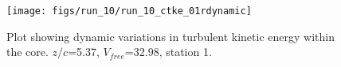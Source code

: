 \begin{figure}[H]
\centering
\texttt{[image: figs/run\_10/run\_10\_ctke\_01rdynamic]}
\caption{Plot showing dynamic variations in turbulent kinetic energy within the core. $z/c$=5.37, $V_{free}$=32.98, station 1.}
\label{fig:run_10_ctke_01rdynamic}
\end{figure}


